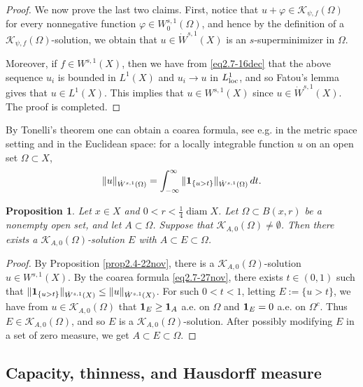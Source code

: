 \documentclass[11pt,leqno]{amsart}
\newtheorem{proposition}[theorem]{Proposition}
\numberwithin{equation}{section}
\theoremstyle{definition}
\DeclareMathOperator{\diam}{diam}
\begin{document}
\begin{proof}
		We now prove the last two claims. First, 
		notice that $u+\varphi\in \mathcal K_{\psi,f}(\Omega)$ for every nonnegative function $\varphi\in W^{s,1}_0(\Omega)$, and hence by the definition of a $\mathcal K_{\psi,f}(\Omega)$-solution, we obtain  that $u\in \dot W^{s,1}(X)$ is an $s$-superminimizer 
		{in $\Omega$.}
		
		Moreover,
		if $f\in W^{s,1}(X)$, then  we have from \eqref{eq2.7-16dec} that the above sequence $u_i$ is bounded in $L^1(X)$  and $u_i\to u$ in $L^1_{\rm loc}$, and so Fatou's lemma gives that $u\in L^1(X)$. This implies that $u\in W^{s,1}(X)$ since $u\in \dot W^{s,1}(X)$.
		The proof is completed.
	\end{proof}
	By  Tonelli's theorem one can obtain a coarea formula, see e.g. \cite{KLLZ25} in the metric
	space setting and \cite{ Vi91}  in the Euclidean space: for a locally integrable function $u$
	on an open set $\Omega\subset X$,
	\begin{equation}\label{eq2.7-27nov}
		\|u\|_{\dot W^{s,1}(\Omega)}=\int_{-\infty}^\infty \| {\bf 1}_{\{ u>t\}}\|_{\dot W^{s,1}(\Omega)} \,dt.
	\end{equation}
	\begin{proposition}\label{prop2.5-22nov}		
		Let 
		$x\in X$ and $0<r<\frac{1}{4}\diam X$.
		Let $\Omega\subset B(x,r)$ be a nonempty open set, and let $A\subset \Omega$.
		Suppose that $\mathcal K_{A,0}(\Omega)\neq \emptyset$. 
		Then  there exists  a $\mathcal K_{A,0}(\Omega)$-solution $E$ with $A\subset E\subset \Omega$.
	\end{proposition}
	\begin{proof}
		By Proposition \ref{prop2.4-22nov}, 
		there is   a $\mathcal K_{A,0}(\Omega)$-solution $u\in  W^{s,1}(X)$. By the coarea
		formula \eqref{eq2.7-27nov},  there exists $t\in (0,1)$ such that
		$\|{\bf 1} _{\{u>t\}}\|_{\dot W^{s,1}(X)}\leq \|u\|_{\dot W^{s,1}(X)} $. For such $0<t<1$,
		letting $E:=\{u>t\}$, we have from $u\in \mathcal K_{A,0}(\Omega)$ that ${\bf 1}_E\geq {\bf 1}_A$
		a.e. on $\Omega$ and ${\bf 1}_E=0$ a.e.  on $\Omega^c$.
		Thus $E\in \mathcal K_{A,0}(\Omega)$, and so  $E$ is a $\mathcal K_{A,0}(\Omega)$-solution.
		After possibly modifying $E$ in a set of zero measure, we get $A\subset E\subset\Omega$.
	\end{proof}
	
	\subsection{Capacity, thinness, and Hausdorff measure}\label{subsection5.1}\
	
\end{document}
